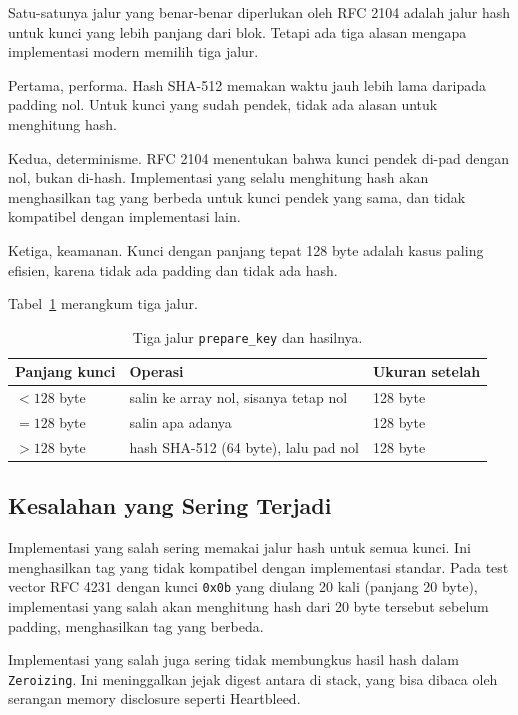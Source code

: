 \documentclass[11pt,a4paper]{article}
\begin{document}
Satu-satunya jalur yang benar-benar diperlukan oleh RFC 2104 adalah jalur hash untuk kunci yang lebih panjang dari blok. Tetapi ada tiga alasan mengapa implementasi modern memilih tiga jalur.

Pertama, performa. Hash SHA-512 memakan waktu jauh lebih lama daripada padding nol. Untuk kunci yang sudah pendek, tidak ada alasan untuk menghitung hash.

Kedua, determinisme. RFC 2104 menentukan bahwa kunci pendek di-pad dengan nol, bukan di-hash. Implementasi yang selalu menghitung hash akan menghasilkan tag yang berbeda untuk kunci pendek yang sama, dan tidak kompatibel dengan implementasi lain.

Ketiga, keamanan. Kunci dengan panjang tepat 128 byte adalah kasus paling efisien, karena tidak ada padding dan tidak ada hash.

Tabel~\ref{tab:key-cases} merangkum tiga jalur.

\begin{table}[H]
	\centering
	\caption{Tiga jalur \texttt{prepare\_key} dan hasilnya.}
	\label{tab:key-cases}
	\small
	\begin{tabularx}{\textwidth}{l X l}
		\toprule
		Panjang kunci & Operasi                               & Ukuran setelah \\
		\midrule
		$< 128$ byte  & salin ke array nol, sisanya tetap nol & 128 byte       \\
		$= 128$ byte  & salin apa adanya                      & 128 byte       \\
		$> 128$ byte  & hash SHA-512 (64 byte), lalu pad nol  & 128 byte       \\
		\bottomrule
	\end{tabularx}
\end{table}

\subsection{Kesalahan yang Sering Terjadi}

Implementasi yang salah sering memakai jalur hash untuk semua kunci. Ini menghasilkan tag yang tidak kompatibel dengan implementasi standar. Pada test vector RFC 4231 dengan kunci \texttt{0x0b} yang diulang 20 kali (panjang 20 byte), implementasi yang salah akan menghitung hash dari 20 byte tersebut sebelum padding, menghasilkan tag yang berbeda.

Implementasi yang salah juga sering tidak membungkus hasil hash dalam \texttt{Zeroizing}. Ini meninggalkan jejak digest antara di stack, yang bisa dibaca oleh serangan memory disclosure seperti Heartbleed.
\end{document}
